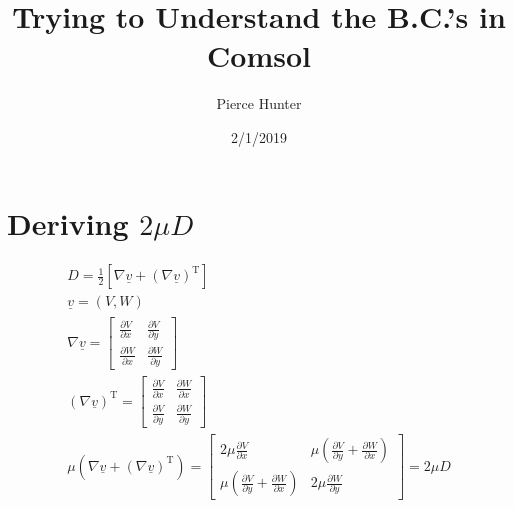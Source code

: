 \documentclass[letterpaper,landscape, 10pt]{article}
\title{Trying to Understand the B.C.'s in Comsol}
\author{Pierce Hunter}
\date{2/1/2019}
\renewcommand{\vec}[1]{\underline{#1}}
\newcommand{\pd}[2]{\frac{\partial #1}{\partial #2}}
\newcommand{\transpose}[1]{#1^\text{T}}
\begin{document}
	\maketitle
	\section{Deriving $ 2\mu D $}
	\begin{gather*}
		D = \frac{1}{2}\left[\nabla\vec{v} + \transpose{\left(\nabla\vec{v}\right)}\right]\\
		\vec{v} = \left(V,W\right)\\
		\nabla\vec{v} = \begin{bmatrix}
		\displaystyle\pd{V}{x} & \displaystyle\pd{V}{y}\\
		\displaystyle\pd{W}{x} &\displaystyle \pd{W}{y}
		\end{bmatrix}\\
		\transpose{\left(\nabla\vec{v}\right)} = \begin{bmatrix}
		\displaystyle\pd{V}{x} &\displaystyle \pd{W}{x}\\
		\displaystyle\pd{V}{y} &\displaystyle \pd{W}{y}
		\end{bmatrix}\\
		\mu\left(\nabla\vec{v} + \transpose{\left(\nabla\vec{v}\right)}\right) = \begin{bmatrix}
		\displaystyle2\mu\pd{V}{x} & \displaystyle\mu\left(\pd{V}{y} + \pd{W}{x}\right)\\
		\displaystyle\mu\left(\pd{V}{y} + \pd{W}{x}\right) & \displaystyle2\mu\pd{W}{y}
		\end{bmatrix} = 2\mu D
	\end{gather*}
\end{document}

